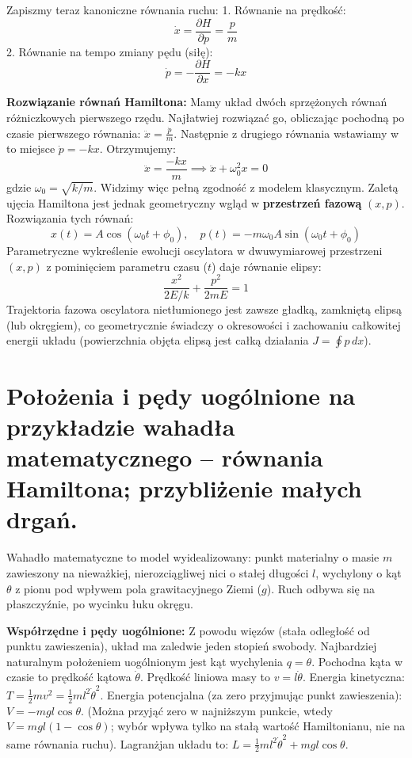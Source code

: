 \documentclass[11pt, a4paper]{article}
\begin{document}
Zapiszmy teraz kanoniczne równania ruchu:
1. Równanie na prędkość: 
\[
\dot{x} = \frac{\partial H}{\partial p} = \frac{p}{m}
\]
2. Równanie na tempo zmiany pędu (siłę):
\[
\dot{p} = -\frac{\partial H}{\partial x} = -kx
\]

\textbf{Rozwiązanie równań Hamiltona:}
Mamy układ dwóch sprzężonych równań różniczkowych pierwszego rzędu. Najłatwiej rozwiązać go, obliczając pochodną po czasie pierwszego równania: $\ddot{x} = \frac{\dot{p}}{m}$. Następnie z drugiego równania wstawiamy w to miejsce $\dot{p} = -kx$. Otrzymujemy:
\[
\ddot{x} = \frac{-kx}{m} \implies \ddot{x} + \omega_0^2 x = 0
\]
gdzie $\omega_0 = \sqrt{k/m}$. Widzimy więc pełną zgodność z modelem klasycznym. 
Zaletą ujęcia Hamiltona jest jednak geometryczny wgląd w \textbf{przestrzeń fazową} $(x, p)$. Rozwiązania tych równań:
\[
x(t) = A \cos(\omega_0 t + \phi_0), \quad p(t) = -m\omega_0 A \sin(\omega_0 t + \phi_0)
\]
Parametryczne wykreślenie ewolucji oscylatora w dwuwymiarowej przestrzeni $(x, p)$ z pominięciem parametru czasu ($t$) daje równanie elipsy:
\[
\frac{x^2}{2E/k} + \frac{p^2}{2mE} = 1
\]
Trajektoria fazowa oscylatora nietłumionego jest zawsze gładką, zamkniętą elipsą (lub okręgiem), co geometrycznie świadczy o okresowości i zachowaniu całkowitej energii układu (powierzchnia objęta elipsą jest całką działania $J = \oint p \, dx$).

\section{Położenia i pędy uogólnione na przykładzie wahadła matematycznego – równania Hamiltona; przybliżenie małych drgań.}

Wahadło matematyczne to model wyidealizowany: punkt materialny o masie $m$ zawieszony na nieważkiej, nierozciągliwej nici o stałej długości $l$, wychylony o kąt $\theta$ z pionu pod wpływem pola grawitacyjnego Ziemi ($g$). Ruch odbywa się na płaszczyźnie, po wycinku łuku okręgu.

\textbf{Współrzędne i pędy uogólnione:}
Z powodu więzów (stała odległość od punktu zawieszenia), układ ma zaledwie jeden stopień swobody. Najbardziej naturalnym położeniem uogólnionym jest kąt wychylenia $q = \theta$.
Pochodna kąta w czasie to prędkość kątowa $\dot{\theta}$. Prędkość liniowa masy to $v = l\dot{\theta}$.
Energia kinetyczna: $T = \frac{1}{2}mv^2 = \frac{1}{2}ml^2\dot{\theta}^2$.
Energia potencjalna (za zero przyjmując punkt zawieszenia): $V = -mgl\cos\theta$.
(Można przyjąć zero w najniższym punkcie, wtedy $V = mgl(1-\cos\theta)$; wybór wpływa tylko na stałą wartość Hamiltonianu, nie na same równania ruchu).
Lagranżjan układu to: $L = \frac{1}{2}ml^2\dot{\theta}^2 + mgl\cos\theta$.
\end{document}
